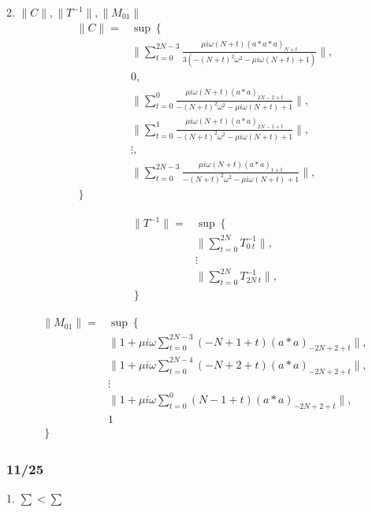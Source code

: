 \documentclass[11pt,a4paper]{jsarticle}
\theoremstyle{definition}
\begin{document}
2. $\|C\|, \|T^{-1}\|, \|M_{01}\|$
\begin{equation}
  \begin{split}
    \|C\| =& \sup \left\lbrace \right. \\
    & \| \sum_{t=0}^{2N-3} \frac{\mu i \omega (N+t) (a*a*a)_{N+t}}{3(-(N+t)^2 \omega^2 - \mu i \omega (N+t)+ 1)} \|,\\
    & 0,\\
    & \| \sum_{t=0}^{0} \frac{ \mu i \omega (N+t) (a*a)_{2N-2 + t}}{-(N+t)^2 \omega^2 - \mu i \omega (N+t)+ 1} \|,\\
    & \| \sum_{t=0}^{1} \frac{ \mu i \omega (N+t) (a*a)_{2N-1 + t} }{-(N+t)^2 \omega^2 - \mu i \omega (N+t)+ 1}\|,\\
    & \vdots , \\
    & \| \sum_{t=0}^{2N-3} \frac{ \mu i \omega (N+t) (a*a)_{1 + t} }{-(N+t)^2 \omega^2 - \mu i \omega (N+t)+ 1}\|,\\
    \left. \right\rbrace&
  \end{split}
\end{equation}


\begin{equation}
  \begin{split}
    \|T^{-1}\| =& \sup \left\lbrace \right. \\
    & \|\sum_{t=0}^{2N} T_{0\ t}^{-1}\|, \\
    & \vdots \\
    & \|\sum_{t=0}^{2N} T_{2N\ t}^{-1}\|, \\
    \left. \right\rbrace&
  \end{split}
\end{equation}

\begin{equation}
  \begin{split}
    \|M_{01}\| =& \sup \left\lbrace \right. \\
    &\| 1 + \mu i \omega \sum_{t=0}^{2N-3} (-N+1 + t) (a*a)_{-2N+2+t} \| , \\
    &\| 1 + \mu i \omega \sum_{t=0}^{2N-4} (-N+2 + t) (a*a)_{-2N+2+t} \| , \\
    & \vdots \\
    &\| 1 + \mu i \omega \sum_{t=0}^{0} (N-1 + t) (a*a)_{-2N+2+t} \| , \\
    & 1 \\
    \left. \right\rbrace&
  \end{split}
\end{equation}

\subsubsection{11/25}
1. $\sum < \sum$
\end{document}
